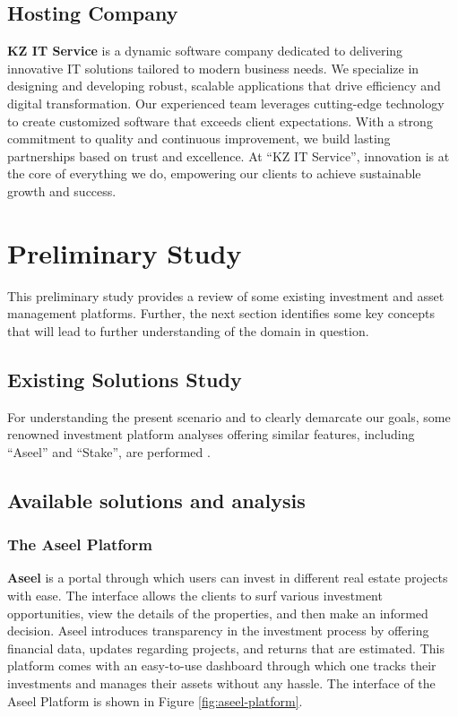 \subsection{Hosting Company}

\textbf{\textcolor{primary}{KZ IT Service}} is a dynamic software company dedicated to delivering innovative IT solutions tailored to modern business needs. We specialize in designing and developing robust, scalable applications that drive efficiency and digital transformation. Our experienced team leverages cutting-edge technology to create customized software that exceeds client expectations. With a strong commitment to quality and continuous improvement, we build lasting partnerships based on trust and excellence. At ``KZ IT Service'', innovation is at the core of everything we do, empowering our clients to achieve sustainable growth and success.

\section{Preliminary Study}

This preliminary study provides a review of some existing investment and asset management platforms. Further, the next section identifies some key concepts that will lead to further understanding of the domain in question.

\subsection{Existing Solutions Study}

For understanding the present scenario and to clearly demarcate our goals, some renowned investment platform analyses offering similar features, including ``Aseel'' and ``Stake'', are performed \cite{G2CompetitiveAnalysis2024, AsanaCompetitiveAnalysis2024}.

\subsection{Available solutions and analysis}

\subsubsection{The Aseel Platform}

\textbf{\textcolor{primary}{Aseel}} is a portal through which users can invest in different real estate projects with ease. The interface allows the clients to surf various investment opportunities, view the details of the properties, and then make an informed decision. Aseel introduces transparency in the investment process by offering financial data, updates regarding projects, and returns that are estimated. This platform comes with an easy-to-use dashboard through which one tracks their investments and manages their assets without any hassle. The interface of the Aseel Platform is shown in Figure \ref{fig:aseel-platform}.

